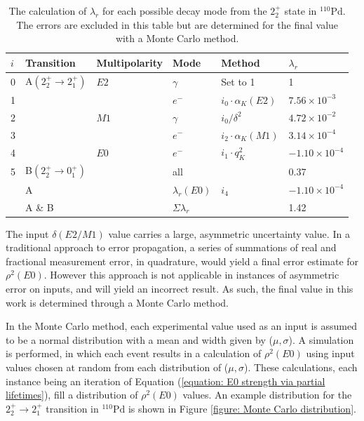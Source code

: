 \begin{table}
  \begin{center}
    \begin{tabular}{|l|l|l|l|l|l|} 
     \hline
     $i$& Transition 					& Multipolarity & Mode 					& Method 					& $\lambda_r$ 			\\  
     \hline
     0	& A$(2_2^+ \rightarrow 2_1^+)$	& $E2$			& $\gamma$				& Set to 1					& 1						\\ 
     1	&								& 				& $e^-$					& $i_0 \cdot \alpha_K(E2)$	& $7.56 \times 10^{-3}$	\\ 
     2	&								& $M1$			& $\gamma$				& $i_0 / \delta^2$			& $4.72 \times 10^{-2}$	\\ 
     3	&								& 				& $e^-$					& $i_2 \cdot \alpha_K(M1)$	& $3.14 \times 10^{-4}$	\\ 
     4	&								& $E0$			& $e^-$					& $i_1 \cdot q_K^2$			& $-1.10 \times 10^{-4}$	\\ 
     5	& B$(2_2^+ \rightarrow 0_1^+)$	& 				& all					& 							& 0.37					\\
     \hline
     	&	A							&				& $\lambda_r(E0)$		& $i_4$ 					& $-1.10 \times 10^{-4}$	\\
    	&	A \& B						&				& $\Sigma \lambda_r$	&							& 1.42					\\
     \hline
    \end{tabular}
  \end{center}
  \caption[The calculation of $\lambda_r$ for each possible decay mode from the $2^+_2$ state in $^{110}$Pd.]{The calculation of $\lambda_r$ for each possible decay mode from the $2^+_2$ state in $^{110}$Pd. The errors are excluded in this table but are determined for the final value with a Monte Carlo method.}
  \label{table: inputs to the partial lifetime calculation of E0 strength}
\end{table}

The input $\delta(E2/M1)$ value carries a large, asymmetric uncertainty value. In a traditional approach to error propagation, a series of summations of real and fractional measurement error, in quadrature, would yield a final error estimate for $\rho^2(E0)$. However this approach is not applicable in instances of asymmetric error on inputs, and will yield an incorrect result. As such, the final value in this work is determined through a Monte Carlo method.

In the Monte Carlo method, each experimental value used as an input is assumed to be a normal distribution with a mean and width given by ($\mu, \sigma $). A simulation is performed, in which each event results in a calculation of $\rho^2(E0)$ using input values chosen at random from each distribution of ($\mu, \sigma$). These calculations, each instance being an iteration of Equation (\ref{equation: E0 strength via partial lifetimes}), fill a distribution of $\rho^2(E0)$ values. An example distribution for the $2_2^+ \rightarrow 2_1^+$ transition in $^{110}\mathrm{Pd}$ is shown in Figure \ref{figure: Monte Carlo distribution}.

